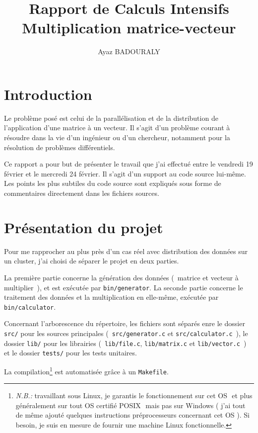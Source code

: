 \documentclass[a4paper,10pt]{article}
\title{Rapport de Calculs Intensifs\\Multiplication matrice-vecteur}
\author{Ayaz BADOURALY}
\begin{document}
\maketitle

\section{Introduction}

Le problème posé est celui de la parallélisation et de la distribution de l'application d'une matrice à un vecteur. Il s'agit d'un problème courant à résoudre dans la vie d'un ingénieur ou d'un chercheur, notamment pour la résolution de problèmes différentiels.

\bigskip

Ce rapport a pour but de présenter le travail que j'ai effectué entre le vendredi 19 février et le mercredi 24 février. Il s'agit d'un support au code source lui-même. Les points les plus subtiles du code source sont expliqués sous forme de commentaires directement dans les fichiers sources.

\section{Présentation du projet}

Pour me rapprocher au plus près d'un cas réel avec distribution des données sur un cluster, j'ai choisi de séparer le projet en deux parties. 

La première partie concerne la génération des données (~matrice et vecteur à multiplier~), et est exécutée par \texttt{bin/generator}. La seconde partie concerne le traitement des données et la multiplication en elle-même, exécutée par \texttt{bin/calculator}.

\bigskip

Concernant l'arborescence du répertoire, les fichiers sont séparés enre le dossier \texttt{src/} pour les sources principales (~\texttt{src/generator.c} et \texttt{src/calculator.c}~), le dossier \texttt{lib/} pour les librairies (~\texttt{lib/file.c}, \texttt{lib/matrix.c} et \texttt{lib/vector.c}~) et le dossier \texttt{tests/} pour les tests unitaires.

\bigskip

La compilation\footnote{\textit{N.B.:} travaillant sous Linux, je garantis le fonctionnement sur cet OS \textemdash $ $ et plus généralement sur tout OS certifié POSIX \textemdash $ $ mais pas sur Windows ( j'ai tout de même ajouté quelques instructions préprocesseurs concernant cet OS ). Si besoin, je suis en mesure de fournir une machine Linux fonctionnelle.} est automatisée grâce à un \texttt{Makefile}.
\end{document}
